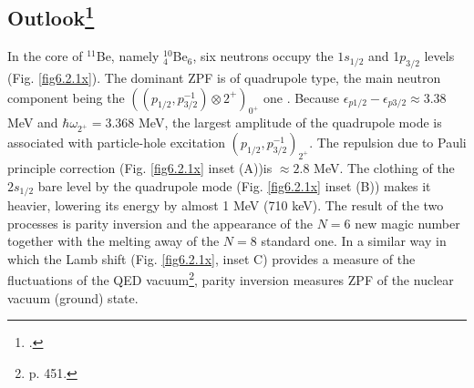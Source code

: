  \subsection[Outlook]{Outlook\footnote{\cite{Barranco:17}.}}
  In the core of $^{11}$Be, namely $^{10}_{4}$Be$_{6}$, six neutrons occupy the $1s_{1/2}$ and 1$p_{3/2}$ levels (Fig. \ref{fig6.2.1x}). The 
  dominant ZPF is of quadrupole type, the main neutron  component being  the 
  $((p_{1/2},p^{-1}_{3/2})\otimes 2^+)_{0^+}$ one . Because $\epsilon_{p1/2} -
  \epsilon_{p3/2}\approx 3.38 $ MeV and $\hbar \omega_{2^+} =$3.368 MeV, the largest 
  amplitude of the quadrupole mode is associated with particle-hole excitation $(p_{1/2},p^{-1}_{3/2})_{2^+}$.
  The repulsion due to Pauli principle correction  (Fig. \ref{fig6.2.1x}  inset (A))is $\approx 2.8$ MeV.  
  The clothing of the $2s_{1/2}$ bare level by the quadrupole mode
  (Fig. \ref{fig6.2.1x} inset (B)) makes it  heavier, 
  lowering its energy by almost 1 MeV (710 keV). The result of the two processes  
  is parity inversion  and the  appearance of  the $N=6$ new magic number together with the melting 
  away of the $N=8$ standard one.
 In a similar way  in which the Lamb shift  (Fig. \ref{fig6.2.1x}, inset C)  provides a measure 
 of  the fluctuations of the QED vacuum\footnote{\cite{Pais:86} p. 451.},  parity inversion 
 measures ZPF of the nuclear vacuum (ground) state. 
